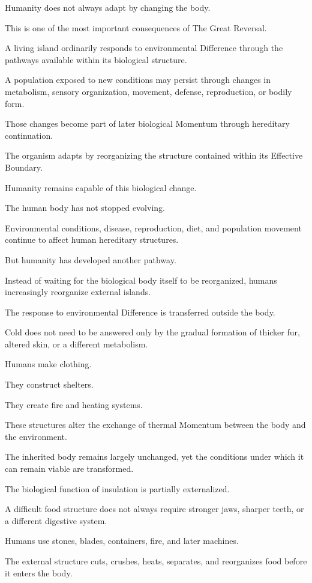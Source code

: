 Humanity does not always adapt by changing the body.

This is one of the most important consequences of The Great Reversal.

A living island ordinarily responds to environmental Difference through the pathways available within its biological structure.

A population exposed to new conditions may persist through changes in metabolism, sensory organization, movement, defense, reproduction, or bodily form.

Those changes become part of later biological Momentum through hereditary continuation.

The organism adapts by reorganizing the structure contained within its Effective Boundary.

Humanity remains capable of this biological change.

The human body has not stopped evolving.

Environmental conditions, disease, reproduction, diet, and population movement continue to affect human hereditary structures.

But humanity has developed another pathway.

Instead of waiting for the biological body itself to be reorganized, humans increasingly reorganize external islands.

The response to environmental Difference is transferred outside the body.

Cold does not need to be answered only by the gradual formation of thicker fur, altered skin, or a different metabolism.

Humans make clothing.

They construct shelters.

They create fire and heating systems.

These structures alter the exchange of thermal Momentum between the body and the environment.

The inherited body remains largely unchanged, yet the conditions under which it can remain viable are transformed.

The biological function of insulation is partially externalized.

A difficult food structure does not always require stronger jaws, sharper teeth, or a different digestive system.

Humans use stones, blades, containers, fire, and later machines.

The external structure cuts, crushes, heats, separates, and reorganizes food before it enters the body.

